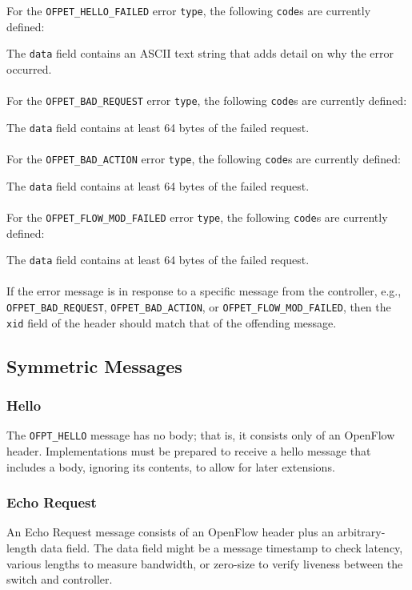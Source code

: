 
For the \verb|OFPET_HELLO_FAILED| error \verb|type|, the following \verb|code|s are currently defined:


The \verb|data| field contains an ASCII text string that adds detail on why the error occurred.
\\\\
For the \verb|OFPET_BAD_REQUEST| error \verb|type|, the following \verb|code|s are currently defined:


The \verb|data| field contains at least 64 bytes of the failed request.
\\\\
For the \verb|OFPET_BAD_ACTION| error \verb|type|, the following \verb|code|s are currently defined:


The \verb|data| field contains at least 64 bytes of the failed request.
\\\\
For the \verb|OFPET_FLOW_MOD_FAILED| error \verb|type|, the following \verb|code|s are currently defined:


The \verb|data| field contains at least 64 bytes of the failed request.
\\\\
If the error message is in response to a specific message from the controller, e.g., \verb|OFPET_BAD_REQUEST|, \verb|OFPET_BAD_ACTION|, or \verb|OFPET_FLOW_MOD_FAILED|, then the \verb|xid| field of the header should match that of the offending message.

\subsection{Symmetric Messages}
\subsubsection{Hello}
The \verb|OFPT_HELLO| message has no body; that is, it consists only of an OpenFlow header. Implementations must be prepared to receive a hello message that includes a body, ignoring its contents, to allow for later extensions. 

\subsubsection{Echo Request}
An Echo Request message consists of an OpenFlow header plus an arbitrary-length data field.  The data field might be a message timestamp to check latency, various lengths to measure bandwidth, or zero-size to verify liveness between the switch and controller.

